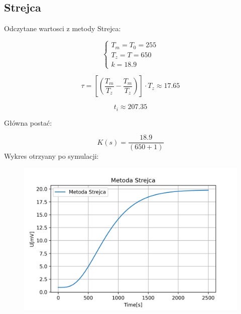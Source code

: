 \documentclass{article}
\begin{document}
\subsection{Strejca}

Odczytane wartosci z metody Strejca:

\[\begin{cases}
    T_{m}=T_{0}=255
    \\
    T_{z}=T=650
    \\
    k=18.9
\end{cases}\]

$$\tau = 
\left[
    \left(
        \frac{T_{m}}{T_{z}}
        -
        \frac{T_{m}}{T_{z}}
    \right)
\right]
\cdot
T_{z}\approx17.65$$

$$ t_{i}\approx207.35 $$

Główna postać:

$$ K\left(s\right)=\frac{18.9}{\left(650+1\right)} $$
Wykres otrzyany po symulacji:

\begin{figure}[h!]
    \centering
    \includegraphics[scale=0.7]{metoda_strejca.png}
\end{figure}


\newpage
\end{document}
